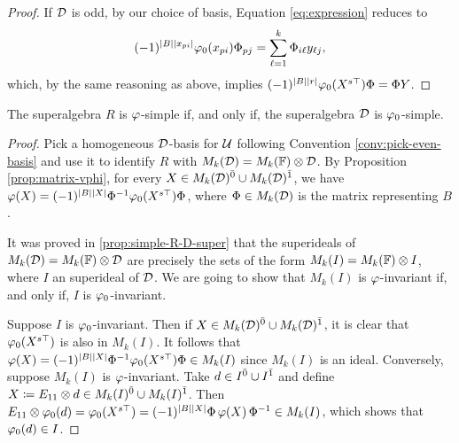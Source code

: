 \begin{proof}
	If $\mathcal{D}$ is odd, by our choice of basis, Equation \eqref{eq:expression} reduces to
	\[
		(-1)^{|B| |x_{pi}|} \varphi_0(x_{pi}) \Phi_{pj} =  \sum_{\ell=1}^k \Phi_{i \ell} y_{\ell j},
	\]
	which, by the same reasoning as above, implies $(-1)^{|B||r|} \varphi_0(X^{s\top}) \Phi = \Phi Y$. 
\end{proof}

\begin{prop}\label{prop:vphi-R-simple-D-simple}
	The superalgebra $R$ is $\varphi$-simple if, and only if, the superalgebra $\mathcal{D}$ is $\varphi_0$-simple. 
\end{prop}

\begin{proof}
	Pick a homogeneous $\mathcal{D}$-basis for $\mathcal U$ following Convention \ref{conv:pick-even-basis} and use it to identify $R$ with $M_k(\mathcal{D}) = M_k(\mathbb{F}) \otimes \mathcal{D}$.
	By Proposition \ref{prop:matrix-vphi}, for every $X \in M_k(\mathcal{D})^{\bar0} \cup M_k(\mathcal{D})^{\bar1}$, we have
	$\varphi(X) = (-1)^{|B||X|}\Phi^{-1} \varphi_0(X^{s\top}) \Phi$, where $\Phi \in M_k(\mathcal{D})$ is the matrix representing $B$. 

    It was proved in \cref{prop:simple-R-D-super} that the superideals of $M_k(\mathcal{D}) = M_k(\mathbb{F}) \otimes \mathcal{D}$ are precisely the sets of the form $M_k(I) = M_k(\mathbb{F}) \otimes I$, where $I$ an superideal of $\mathcal{D}$. 
    We are going to show that $M_k(I)$ is $\varphi$-invariant if, and only if, $I$ is $\varphi_0$-invariant. 
    
	Suppose $I$ is $\varphi_0$-invariant.
	Then if $X \in M_k(\mathcal{D})^{\bar0} \cup M_k(\mathcal{D})^{\bar1}$, it is clear that $\varphi_0 (X^{s\top})$ is also in $M_k(I)$.
	It follows that $\varphi(X) = (-1)^{|B||X|} \Phi^{-1} \varphi_0(X^{s\top}) \Phi \in M_k(I)$ since $M_k(I)$ is an ideal.
	Conversely, suppose $M_k(I)$ is $\varphi$-invariant.
	Take $d \in I^{\bar0} \cup I^{\bar1}$ and define $X \coloneqq E_{11} \otimes d \in M_k(I)^{\bar0} \cup M_k(I)^{\bar1}$.
	Then $E_{11} \otimes \varphi_0(d) = \varphi_0(X^{s\top}) = (-1)^{|B||X|} \Phi\, \varphi(X)\, \Phi^{-1} \in M_k(I)$, which shows that $\varphi_0(d) \in I$.
\end{proof}